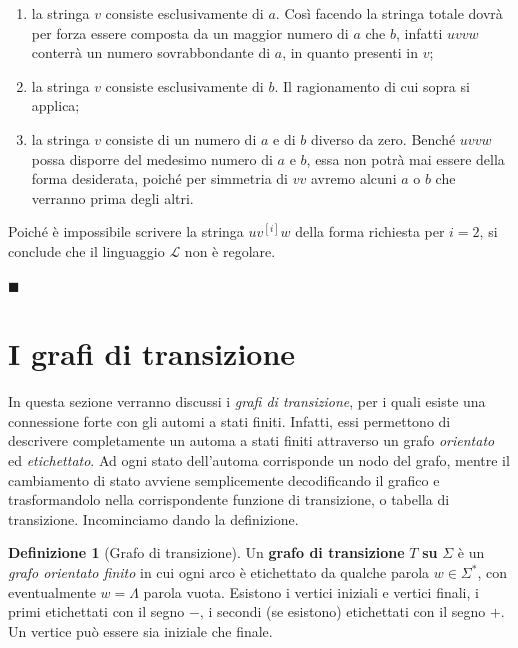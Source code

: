 \documentclass[10pt]{\classname}
\theoremstyle{newlinethm}
\theoremstyle{theorem}
\theoremstyle{definition}
\newtheorem{definizione}{Definizione}[section]
\theoremstyle{definition}
\theoremstyle{definition}
\theoremstyle{definition}
\begin{document}
\begin{enumerate}
    \item la stringa $v$ consiste esclusivamente di $a$. Così facendo la stringa totale dovrà per forza essere composta da un maggior numero di $a$ che $b$, infatti $uvvw$ conterrà un numero sovrabbondante di $a$, in quanto presenti in $v$;
    \item la stringa $v$ consiste esclusivamente di $b$. Il ragionamento di cui sopra si applica;
    \item la stringa $v$ consiste di un numero di $a$ e di $b$ diverso da zero. Benché $uvvw$ possa disporre del medesimo numero di $a$ e $b$, essa non potrà mai essere della forma desiderata, poiché per simmetria di $vv$ avremo alcuni $a$ o $b$ che verranno prima degli altri.
\end{enumerate}

Poiché è impossibile scrivere la stringa $uv^{[i]}w$ della forma richiesta per $i = 2$, si conclude che il linguaggio $\mathcal L$ non è regolare.

\begin{flushright}
$\blacksquare$
\end{flushright}

\clearpage


\section{I grafi di transizione}

In questa sezione verranno discussi i \emph{grafi di transizione}, per i quali esiste una connessione forte con gli automi a stati finiti. Infatti, essi permettono di descrivere completamente un automa a stati finiti attraverso un grafo \emph{orientato} ed \emph{etichettato}. Ad ogni stato dell'automa corrisponde un nodo del grafo, mentre il cambiamento di stato avviene semplicemente decodificando il grafico e trasformandolo nella corrispondente funzione di transizione, o tabella di transizione. Incominciamo dando la definizione.

\begin{definizione}[Grafo di transizione]
Un \textbf{grafo di transizione} $T$ \textbf{su} $\Sigma$ è un \emph{grafo orientato finito} in cui ogni arco è etichettato da qualche parola $w \in \Sigma^*$, con eventualmente $w =\Lambda$ parola vuota. Esistono i vertici iniziali e vertici finali, i primi etichettati con il segno $-$, i secondi (se esistono) etichettati con il segno $+$. Un vertice può essere sia iniziale che finale.
\end{definizione}
\end{document}
